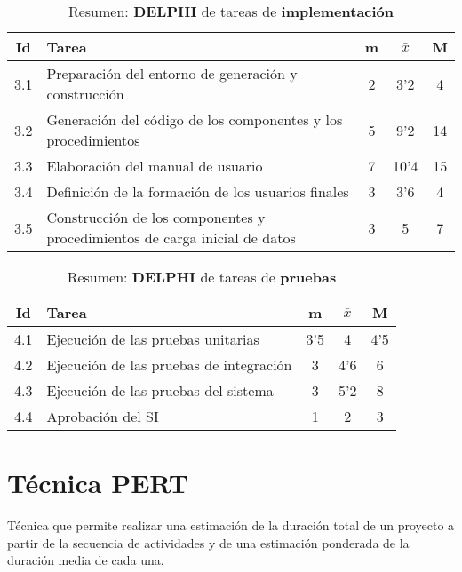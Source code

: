 \documentclass[11pt,a4paper,spanish,twoside]{report}
\begin{document}
\begin{table}[!h]
\centering
  \begin{tabular}{|c||p{8cm}||c|c|c|}
    \hline
    \textbf{Id} & \textbf{Tarea} & \textbf{m} & 
    \textbf{$\bar{x}$} &\textbf{M} \\
    \hline \hline
    3.1 & Preparación del entorno de generación y construcción & 2 & 3'2  & 4 \\
    \hline
    3.2 & Generación del código de los componentes y los procedimientos & 5 &
    9'2 & 14\\
    \hline
    3.3 & Elaboración del manual de usuario & 7 & 10'4 & 15\\
    \hline
    3.4 & Definición de la formación de los usuarios finales & 3 & 3'6 & 4 \\
    \hline
    3.5 & Construcción de los componentes y procedimientos de carga inicial
    de datos & 3 & 5 & 7\\
    \hline
  \end{tabular}
  \caption{Resumen: \textbf{DELPHI} de tareas de \textbf{implementación}}
  \label{Tab:rDELPHIimp}
\end{table}

\begin{table}[!h]
\centering
  \begin{tabular}{|c||p{8cm}||c|c|c|}
    \hline
    \textbf{Id} & \textbf{Tarea} & \textbf{m} & 
    \textbf{$\bar{x}$} &\textbf{M} \\
    \hline \hline
    4.1 & Ejecución de las pruebas unitarias & 3'5 & 4 & 4'5\\
    \hline
    4.2 & Ejecución de las pruebas de integración & 3 & 4'6 & 6\\
    \hline
    4.3 & Ejecución de las pruebas del sistema & 3 & 5'2 & 8\\
    \hline
    4.4 & Aprobación del SI & 1 & 2 & 3 \\
    \hline
  \end{tabular}
  \caption{Resumen: \textbf{DELPHI} de tareas de \textbf{pruebas}}
  \label{Tab:rDELPHIpru}
\end{table}


\chapter{Técnica PERT}
Técnica que permite realizar una estimación de la duración total de un
proyecto a partir de la secuencia de actividades y de una estimación
ponderada de la duración media de cada una. 
\end{document}
